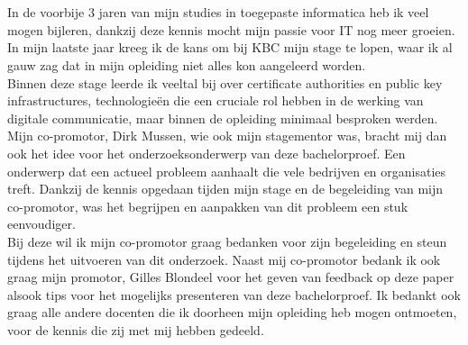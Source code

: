 
\chapter*{}%
\label{ch:voorwoord}


In de voorbije 3 jaren van mijn studies in toegepaste informatica heb ik veel mogen bijleren, dankzij deze kennis mocht mijn passie voor IT nog meer groeien. 
In mijn laatste jaar kreeg ik de kans om bij KBC mijn stage te lopen, waar ik al gauw zag dat in mijn opleiding niet alles kon aangeleerd worden. \\

Binnen deze stage leerde ik veeltal bij over certificate authorities en public key infrastructures, technologieën die een cruciale rol hebben in de werking van digitale communicatie, maar binnen de opleiding minimaal besproken werden.
Mijn co-promotor, Dirk Mussen, wie ook mijn stagementor was, bracht mij dan ook het idee voor het onderzoeksonderwerp van deze bachelorproef. Een onderwerp dat een actueel probleem aanhaalt die vele bedrijven en organisaties treft.
Dankzij de kennis opgedaan tijden mijn stage en de begeleiding van mijn co-promotor, was het begrijpen en aanpakken van dit probleem een stuk eenvoudiger. \\

Bij deze wil ik mijn co-promotor graag bedanken voor zijn begeleiding en steun tijdens het uitvoeren van dit onderzoek. 
Naast mij co-promotor bedank ik ook graag mijn promotor, Gilles Blondeel voor het geven van feedback op deze paper alsook tips voor het mogelijks presenteren van deze bachelorproef.
Ik bedankt ook graag alle andere docenten die ik doorheen mijn opleiding heb mogen ontmoeten, voor de kennis die zij met mij hebben gedeeld.
